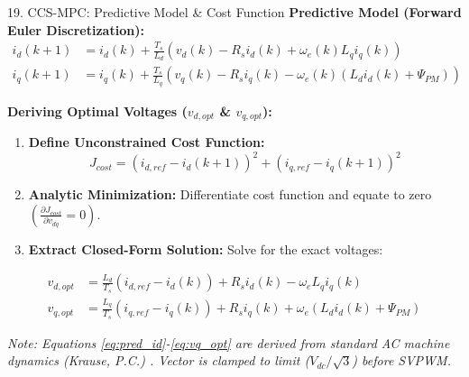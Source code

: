 \documentclass[aspectratio=169]{beamer}
\begin{document}
\begin{frame}{19. CCS-MPC: Predictive Model \& Cost Function}
    \footnotesize
    \textbf{Predictive Model (Forward Euler Discretization):}
    \vspace{-4mm}
    \begin{align}
        i_d(k+1) &= i_d(k) + \frac{T_s}{L_d} \left( v_d(k) - R_s i_d(k) + \omega_e(k) L_q i_q(k) \right) \label{eq:pred_id} \\
        i_q(k+1) &= i_q(k) + \frac{T_s}{L_q} \left( v_q(k) - R_s i_q(k) - \omega_e(k) (L_d i_d(k) + \Psi_{PM}) \right) \label{eq:pred_iq}
    \end{align}
    
    \vspace{-2mm}
    \textbf{Deriving Optimal Voltages ($v_{d,opt}$ \& $v_{q,opt}$):}
    \begin{enumerate}
        \setlength{\itemsep}{0pt}
        \item \textbf{Define Unconstrained Cost Function:} \\
        \vspace{-2mm}
        \begin{equation}
            J_{cost} = (i_{d,ref} - i_d(k+1))^2 + (i_{q,ref} - i_q(k+1))^2 \label{eq:cost}
        \end{equation}
        \vspace{-2mm}
        \item \textbf{Analytic Minimization:} Differentiate cost function and equate to zero $\left( \frac{\partial J_{cost}}{\partial v_{dq}} = 0 \right)$.
        \item \textbf{Extract Closed-Form Solution:} Solve for the exact voltages:
    \end{enumerate}
    
    \vspace{-4mm}
    \begin{align}
        v_{d,opt} &= \frac{L_d}{T_s}(i_{d,ref} - i_d(k)) + R_s i_d(k) - \omega_e L_q i_q(k) \label{eq:vd_opt} \\
        v_{q,opt} &= \frac{L_q}{T_s}(i_{q,ref} - i_q(k)) + R_s i_q(k) + \omega_e (L_d i_d(k) + \Psi_{PM}) \label{eq:vq_opt}
    \end{align}
    
    \vfill
    \begin{flushright}
        \tiny \textit{Note: Equations \ref{eq:pred_id}-\ref{eq:vq_opt} are derived from standard AC machine dynamics (Krause, P.C.) \cite{6}. Vector is clamped to limit ($V_{dc}/\sqrt{3}$) before SVPWM.}
    \end{flushright}
\end{frame}
\end{document}
